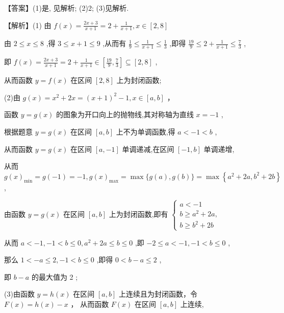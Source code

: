 \documentclass[10pt]{article}
\begin{document}
【答案】(1)是, 见解析; (2)2; (3)见解析.

【解析】(1) 由 \(f\left( x\right)  = \frac{{2x} + 3}{x + 1} = 2 + \frac{1}{x + 1},x \in  \left\lbrack  {2,8}\right\rbrack\)

由 \(2 \leq  x \leq  8\) ,得 \(3 \leq  x + 1 \leq  9\) ,从而有 \(\frac{1}{9} \leq  \frac{1}{x + 1} \leq  \frac{1}{3}\) ,即得 \(\frac{19}{9} \leq  2 + \frac{1}{x + 1} \leq  \frac{7}{3}\) ,

即 \(f\left( x\right)  = \frac{{2x} + 3}{x + 1} = 2 + \frac{1}{x + 1} \in  \left\lbrack  {\frac{19}{9},\frac{7}{3}}\right\rbrack   \subseteq  \left\lbrack  {2,8}\right\rbrack\) ,

从而函数 \(y = f\left( x\right)\) 在区间 \(\left\lbrack  {2,8}\right\rbrack\) 上为封闭函数;

(2)由 \(g\left( x\right)  = {x}^{2} + {2x} = {\left( x + 1\right) }^{2} - 1,x \in  \left\lbrack  {a,b}\right\rbrack\) ，

函数 \(y = g\left( x\right)\) 的图象为开口向上的抛物线,其对称轴为直线 \(x =  - 1\) ,

根据题意 \(y = g\left( x\right)\) 在区间 \(\left\lbrack  {a,b}\right\rbrack\) 上不为单调函数,得 \(a <  - 1 < b\) ,

从而函数 \(y = g\left( x\right)\) 在区间 \(\left\lbrack  {a, - 1}\right\rbrack\) 单调递减,在区间 \(\left\lbrack  {-1,b}\right\rbrack\) 单调递增,

从而 \(g{\left( x\right) }_{\min } = g\left( {-1}\right)  =  - 1,g{\left( x\right) }_{\max } = \max \{ g\left( a\right) ,g\left( b\right) \}  = \max \left\{  {{a}^{2} + {2a},{b}^{2} + {2b}}\right\}\) ,

由函数 \(y = g\left( x\right)\) 在区间 \(\left\lbrack  {a,b}\right\rbrack\) 上为封闭函数,即有 \(\left\{  \begin{array}{l} a <  - 1 \\  b \geq  {a}^{2} + {2a}, \\  b \geq  {b}^{2} + {2b} \end{array}\right.\)

从而 \(a <  - 1, - 1 < b \leq  0,{a}^{2} + {2a} \leq  b \leq  0\) ,即 \(- 2 \leq  a <  - 1, - 1 < b \leq  0\) ,

那么 \(1 <  - a \leq  2, - 1 < b \leq  0\) ,即得 \(0 < b - a \leq  2\) ,

即 \(b - a\) 的最大值为 2 ;

(3)由函数 \(y = h\left( x\right)\) 在区间 \(\left\lbrack  {a,b}\right\rbrack\) 上连续且为封闭函数，令 \(F\left( x\right)  = h\left( x\right)  - x\) ， 从而函数 \(F\left( x\right)\) 在区间 \(\left\lbrack  {a,b}\right\rbrack\) 上连续,
\end{document}

